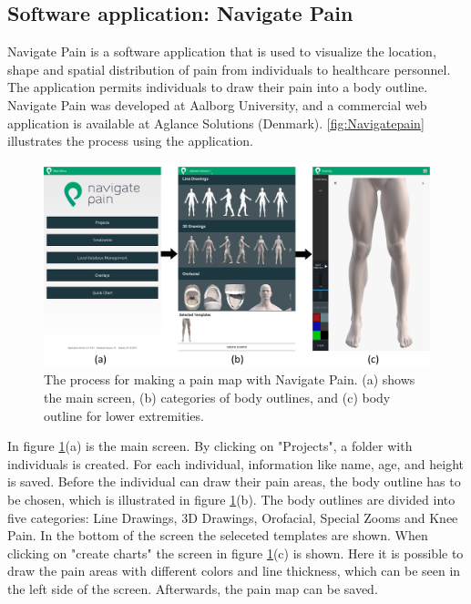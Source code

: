 \subsection{Software application: Navigate Pain} \label{sec:nav}
Navigate Pain is a software application that is used to visualize the location, shape and spatial distribution of pain from individuals to healthcare personnel. The application permits individuals to draw their pain into a body outline. Navigate Pain was developed at Aalborg University, and a commercial web application is available at Aglance Solutions (Denmark).\citep{Solutions2015}
\autoref{fig:Navigatepain} illustrates the process using the application.

\begin{figure} [H]
\centering
\includegraphics[width=1\textwidth]{figures/Navigatepain}
\caption{The process for making a pain map with Navigate Pain. (a) shows the main screen, (b) categories of body outlines, and (c) body outline for lower extremities.}
\label{fig:Navigatepain}
\end{figure}

\noindent
In figure \ref{fig:Navigatepain}(a) is the main screen. By clicking on "Projects", a folder with individuals is created. For each individual, information like name, age, and height is saved. Before the individual can draw their pain areas, the body outline has to be chosen, which is illustrated in figure \ref{fig:Navigatepain}(b). The body outlines are divided into five categories: Line Drawings, 3D Drawings, Orofacial, Special Zooms and Knee Pain. In the bottom of the screen the seleceted templates are shown. When clicking on "create charts" the screen in figure \ref{fig:Navigatepain}(c) is shown. Here it is possible to draw the pain areas with different colors and line thickness, which can be seen in the left side of the screen. Afterwards, the pain map can be saved.


